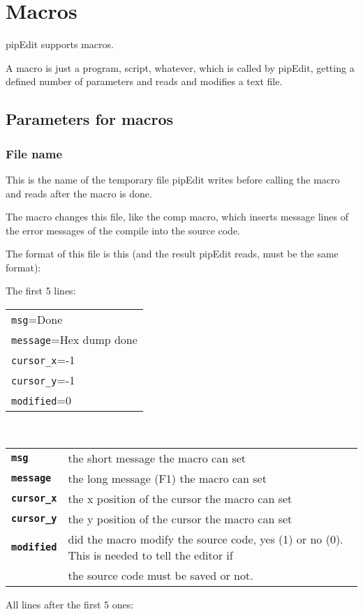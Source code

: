 \documentclass{report}
\begin{document}
\chapter{Macros}

pipEdit supports macros.

A macro is just a program, script, whatever, which is called by pipEdit, 
getting a defined number of parameters and reads and modifies a text file.

\section{Parameters for macros}
\subsection{File name}
This is the name of the temporary file pipEdit writes before calling the macro and reads after the macro is done.

The macro changes this file, like the comp macro, which inserts message lines of the error messages of the compile into the source code.

The format of this file is this (and the result pipEdit reads, must be the same format):

The first 5 lines: \\

\begin{tabular}{l}
\texttt{msg}=Done\\
\texttt{message}=Hex dump done \\
\texttt{cursor\_x}=-1 \\
\texttt{cursor\_y}=-1 \\
\texttt{modified}=0 \\
\end{tabular}
\\
\begin{tabular}{l l}
\textbf{\texttt{msg}} & the short message the macro can set \\
\textbf{\texttt{message}} & the long message (F1) the macro can set \\
\textbf{\texttt{cursor\_x}} & the x position of the cursor the macro can set \\
\textbf{\texttt{cursor\_y}} & the y position of the cursor the macro can set \\
\textbf{\texttt{modified}} & did the macro modify the source code, yes (1) or no (0). This is needed to tell the editor if \\ 
 & the source code must be saved or not. \\
\end{tabular}
\newpage
All lines after the first 5 ones: \\
\end{document}

